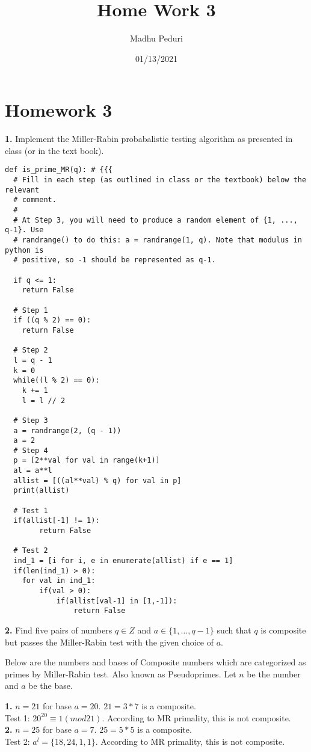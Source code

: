 \documentclass [12pt]{article}
\title{Home Work 3}
\author{Madhu Peduri}
\date{01/13/2021}
\theoremstyle{definition}
\begin{document}
\section*{Homework 3}

{\bf 1.} Implement the Miller-Rabin probabalistic testing algorithm as presented in class (or in the text book). \\

\begin{lstlisting}
def is_prime_MR(q): # {{{
  # Fill in each step (as outlined in class or the textbook) below the relevant
  # comment.
  #
  # At Step 3, you will need to produce a random element of {1, ..., q-1}. Use
  # randrange() to do this: a = randrange(1, q). Note that modulus in python is
  # positive, so -1 should be represented as q-1.

  if q <= 1:
    return False
    
  # Step 1
  if ((q % 2) == 0):
    return False

  # Step 2
  l = q - 1
  k = 0
  while((l % 2) == 0):
    k += 1
    l = l // 2
   
  # Step 3
  a = randrange(2, (q - 1))
  a = 2
  # Step 4
  p = [2**val for val in range(k+1)]
  al = a**l
  allist = [((al**val) % q) for val in p]
  print(allist)
  
  # Test 1
  if(allist[-1] != 1):
        return False   

  # Test 2
  ind_1 = [i for i, e in enumerate(allist) if e == 1]
  if(len(ind_1) > 0):
    for val in ind_1:
        if(val > 0):
            if(allist[val-1] in [1,-1]):
                return False
\end{lstlisting}

\newpage

{\bf 2.} Find five pairs of numbers $q \in Z $ and $a \in \{1, \dots, q-1\}$ such that $q$ is composite but passes the Miller-Rabin test with the given choice of $a$.

\phantom{1em} Below are the numbers and bases of Composite numbers which are categorized as primes by Miller-Rabin test. Also known as Pseudoprimes. Let $n$ be the number and $a$ be the base. 

\phantom{1em} {\bf 1.} $n = 21$ for base $a = 20$. $21 = 3*7$ is a composite. \\
\phantom{1000em} Test 1: $20^{20} \equiv 1 (mod 21)$. According to MR primality, this is not composite.\\


\phantom{1em} {\bf 2.} $n = 25$ for base $a = 7$. $25 = 5*5$ is a composite. \\
\phantom{1000em} Test 2: $a^{l} = \{18,24,1,1\}$. According to MR primality, this is not composite.
\end{document}
